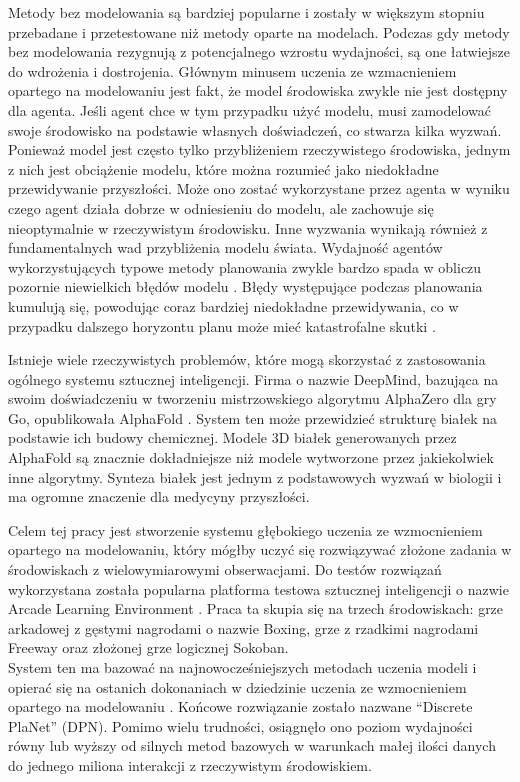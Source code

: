 Metody bez modelowania są bardziej popularne i zostały w większym stopniu przebadane i przetestowane niż metody oparte na modelach. Podczas gdy metody bez modelowania rezygnują z potencjalnego wzrostu wydajności, są one łatwiejsze do wdrożenia i dostrojenia. Głównym minusem uczenia ze wzmacnieniem opartego na modelowaniu jest fakt, że model środowiska zwykle nie jest dostępny dla agenta. Jeśli agent chce w tym przypadku użyć modelu, musi zamodelować swoje środowisko na podstawie własnych doświadczeń, co stwarza kilka wyzwań. Ponieważ model jest często tylko przybliżeniem rzeczywistego środowiska, jednym z nich jest obciążenie modelu, które można rozumieć jako niedokładne przewidywanie przyszłości. Może ono zostać wykorzystane przez agenta \cite{Algo.WorldModels} w wyniku czego agent działa dobrze w odniesieniu do modelu, ale zachowuje się nieoptymalnie w rzeczywistym środowisku. Inne wyzwania wynikają również z fundamentalnych wad przybliżenia modelu świata. Wydajność agentów wykorzystujących typowe metody planowania zwykle bardzo spada w obliczu pozornie niewielkich błędów modelu \cite{Study.PlanWithImperfectModel}. Błędy występujące podczas planowania kumulują się, powodując coraz bardziej niedokładne przewidywania, co w przypadku dalszego horyzontu planu może mieć katastrofalne skutki \cite{Study.CompoundingModelError}.

Istnieje wiele rzeczywistych problemów, które mogą skorzystać z zastosowania ogólnego systemu sztucznej inteligencji. Firma o nazwie DeepMind, bazująca na swoim doświadczeniu w tworzeniu mistrzowskiego algorytmu AlphaZero \cite{Algo.AlphaZero} dla gry Go, opublikowała AlphaFold \cite{Algo.AlphaFold}. System ten może przewidzieć strukturę białek na podstawie ich budowy chemicznej. Modele 3D białek generowanych przez AlphaFold są znacznie dokładniejsze niż modele wytworzone przez jakiekolwiek inne algorytmy. Synteza białek jest jednym z podstawowych wyzwań w biologii i ma ogromne znaczenie dla medycyny przyszłości.

Celem tej pracy jest stworzenie systemu głębokiego uczenia ze wzmocnieniem opartego na modelowaniu, który mógłby uczyć się rozwiązywać złożone zadania w środowiskach z wielowymiarowymi obserwacjami. Do testów rozwiązań wykorzystana została popularna platforma testowa sztucznej inteligencji o nazwie Arcade Learning Environment \cite{Code.ALE}. Praca ta skupia się na trzech środowiskach: grze arkadowej z gęstymi nagrodami o nazwie Boxing, grze z rzadkimi nagrodami Freeway oraz złożonej grze logicznej Sokoban. \\
System ten ma bazować na najnowocześniejszych metodach uczenia modeli \cite{Algo.RecurrentEnvSim}\cite{Algo.JointFrameRewardPrediction}\cite{Algo.FastGenerativeModels} i opierać się na ostanich dokonaniach w dziedzinie uczenia ze wzmocnieniem opartego na modelowaniu \cite{Algo.SimPLe}\cite{Algo.VPN}\cite{Algo.WorldModels}\cite{Algo.PlaNet}. Końcowe rozwiązanie zostało nazwane ``Discrete PlaNet'' (DPN). Pomimo wielu trudności, osiągnęło ono poziom wydajności równy lub wyższy od silnych metod bazowych w warunkach małej ilości danych do jednego miliona interakcji z rzeczywistym środowiskiem.

